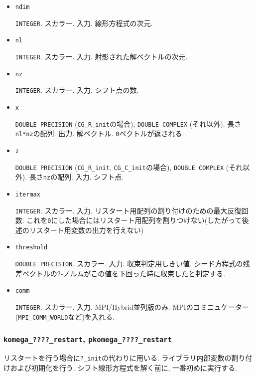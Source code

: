 \documentclass[12pt,titlepage]{jarticle}
\begin{document}
\begin{itemize}

\item \verb|ndim|

  \verb|INTEGER|. スカラー. 入力. 線形方程式の次元.

\item \verb|nl|

  \verb|INTEGER|. スカラー. 入力. 射影された解ベクトルの次元.

\item \verb|nz|

  \verb|INTEGER|. スカラー. 入力. シフト点の数.

\item \verb|x|

  \verb|DOUBLE PRECISION| (\verb|CG_R_init|の場合),
  \verb|DOUBLE COMPLEX| (それ以外).
  長さ \verb|nl*nz|の配列. 出力.
  解ベクトル. \verb|0|ベクトルが返される.

\item \verb|z|

  \verb|DOUBLE PRECISION| (\verb|CG_R_init|, \verb|CG_C_init|の場合),
  \verb|DOUBLE COMPLEX| (それ以外).
  長さ\verb|nz|の配列. 入力. シフト点.

\item \verb|itermax|

  \verb|INTEGER|. スカラー. 入力. リスタート用配列の割り付けのための最大反復回数.
  これを\verb|0|にした場合にはリスタート用配列を割りつけない(したがって後述のリスタート用変数の出力を行えない)

\item \verb|threshold|

  \verb|DOUBLE PRECISION|. スカラー. 入力. 収束判定用しきい値.
  シード方程式の残差ベクトルの2-ノルムがこの値を下回った時に収束したと判定する.

\item \verb|comm|

  \verb|INTEGER|. スカラー. 入力. MPI/Hybrid並列版のみ.
  MPIのコミニュケーター(\verb|MPI_COMM_WORLD|など)を入れる.

\end{itemize}

\subsubsection{\texttt{komega\_????\_restart}, \texttt{pkomega\_????\_restart}}

  リスタートを行う場合に\verb|?_init|の代わりに用いる.
  ライブラリ内部変数の割り付けおよび初期化を行う.
  シフト線形方程式を解く前に, 一番初めに実行する.
\end{document}

